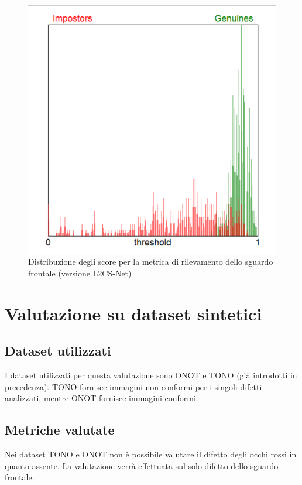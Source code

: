 \documentclass[12pt,a4paper,openright,twoside]{book}
\begin{document}
\begin{figure}
    \centering
    \includegraphics[width=.8\linewidth]{figures/score-distribution-frontal-gaze-l2cs.png}
    \caption{Distribuzione degli score per la metrica di rilevamento dello sguardo frontale (versione L2CS-Net)}
    \label{fig:score_distribution_frontal_gaze_l2cs}
\end{figure}

\section{Valutazione su dataset sintetici}

\subsection{Dataset utilizzati}
I dataset utilizzati per questa valutazione sono ONOT e TONO (già introdotti in precedenza). 
TONO fornisce immagini non conformi per i singoli difetti analizzati, mentre ONOT fornisce immagini conformi.

\subsection{Metriche valutate}
Nei dataset TONO e ONOT non è possibile valutare il difetto degli occhi rossi in quanto assente. 
La valutazione verrà effettuata sul solo difetto dello sguardo frontale.
\end{document}
